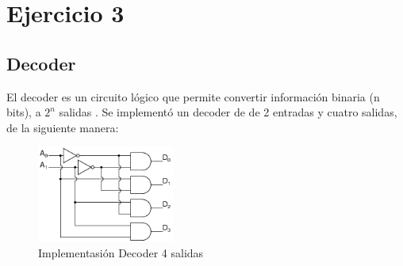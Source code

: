 \documentclass[../../../informe/src/main.tex]{subfiles}
\begin{document}
\section{Ejercicio 3}

\subsection{Decoder}
El decoder es un circuito lógico que permite convertir información binaria (n bits), a $2^{n}$ salidas .
Se implementó un decoder de  de 2 entradas y cuatro salidas, de la siguiente manera:
\begin{figure}[H]
\centering
\includegraphics[width=0.4\textwidth]{imagenes/decoder.png}
\caption{Implementasión Decoder 4 salidas} \label{fig=decoder}
\end{figure}
\end{document}
